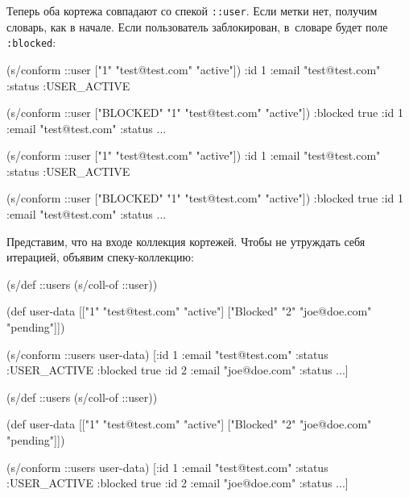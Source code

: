 Теперь оба кортежа совпадают со спекой \verb|::user|. Если метки нет, получим
словарь, как в начале. Если пользователь заблокирован, в~словаре будет поле
\verb|:blocked|:

\ifx\DEVICETYPE\MOBILE

\begin{english}
  \begin{clojure}
(s/conform ::user
  ["1" "test@test.com" "active"])
{:id 1
 :email "test@test.com"
 :status :USER_ACTIVE}

(s/conform ::user
  ["BLOCKED" "1"
   "test@test.com" "active"])
{:blocked true
 :id 1
 :email "test@test.com"
 :status ...}
  \end{clojure}
\end{english}

\else

\begin{english}
  \begin{clojure}
(s/conform ::user ["1" "test@test.com" "active"])
{:id 1 :email "test@test.com" :status :USER_ACTIVE}

(s/conform ::user ["BLOCKED" "1" "test@test.com" "active"])
{:blocked true :id 1 :email "test@test.com" :status ...}
  \end{clojure}
\end{english}

\fi

Представим, что на входе коллекция кортежей. Чтобы не утруждать себя итерацией,
объявим спеку-коллекцию:

\ifx\DEVICETYPE\MOBILE

\begin{english}
  \begin{clojure}
(s/def ::users (s/coll-of ::user))

(def user-data
  [["1" "test@test.com" "active"]
   ["Blocked" "2" "joe@doe.com"
    "pending"]])

(s/conform ::users user-data)
[{:id 1
  :email "test@test.com"
  :status :USER_ACTIVE}
 {:blocked true
  :id 2
  :email "joe@doe.com"
  :status ...}]
  \end{clojure}
\end{english}

\else

\begin{english}
  \begin{clojure}
(s/def ::users (s/coll-of ::user))

(def user-data
  [["1" "test@test.com" "active"]
   ["Blocked" "2" "joe@doe.com" "pending"]])

(s/conform ::users user-data)
[{:id 1 :email "test@test.com" :status :USER_ACTIVE}
 {:blocked true :id 2 :email "joe@doe.com" :status ...}]
  \end{clojure}
\end{english}

